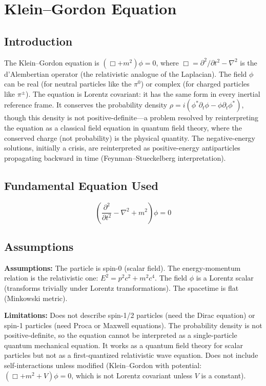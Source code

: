 \chapter{Klein--Gordon Equation}

\section*{Introduction}

The Klein--Gordon equation is $(\Box + m^2)\phi = 0$, where $\Box = \partial^2/\partial t^2 - \nabla^2$ is the d'Alembertian operator (the relativistic analogue of the Laplacian). The field $\phi$ can be real (for neutral particles like the $\pi^0$) or complex (for charged particles like $\pi^\pm$). The equation is Lorentz covariant: it has the same form in every inertial reference frame. It conserves the probability density $\rho = i(\phi^*\partial_t\phi - \phi\partial_t\phi^*)$, though this density is not positive-definite---a problem resolved by reinterpreting the equation as a classical field equation in quantum field theory, where the conserved charge (not probability) is the physical quantity. The negative-energy solutions, initially a crisis, are reinterpreted as positive-energy antiparticles propagating backward in time (Feynman--Stueckelberg interpretation).
\section*{Fundamental Equation Used}

\[
\left(\frac{\partial^2}{\partial t^2}-\nabla^2+m^2\right)\phi=0
\]
\section*{Assumptions}

\textbf{Assumptions:} The particle is spin-0 (scalar field). The energy-momentum relation is the relativistic one: $E^2 = p^2c^2 + m^2c^4$. The field $\phi$ is a Lorentz scalar (transforms trivially under Lorentz transformations). The spacetime is flat (Minkowski metric).


\textbf{Limitations:} Does not describe spin-1/2 particles (need the Dirac equation) or spin-1 particles (need Proca or Maxwell equations). The probability density is not positive-definite, so the equation cannot be interpreted as a single-particle quantum mechanical equation. It works as a quantum field theory for scalar particles but not as a first-quantized relativistic wave equation. Does not include self-interactions unless modified (Klein--Gordon with potential: $(\Box + m^2 + V)\phi = 0$, which is not Lorentz covariant unless $V$ is a constant).



